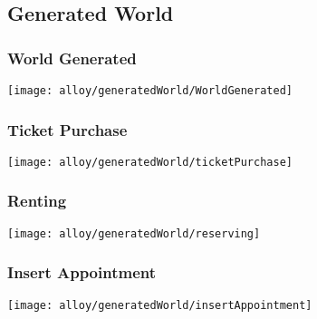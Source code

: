 	
\subsection{Generated World}

	\begin{landscape}
		\subsubsection{World Generated}
			\texttt{[image: alloy/generatedWorld/WorldGenerated]}
	
		\subsubsection{Ticket Purchase}
			\texttt{[image: alloy/generatedWorld/ticketPurchase]}
	
		\subsubsection{Renting}
			\texttt{[image: alloy/generatedWorld/reserving]}
		
		\subsubsection{Insert Appointment}
			\texttt{[image: alloy/generatedWorld/insertAppointment]}
	\end{landscape}
	
	
